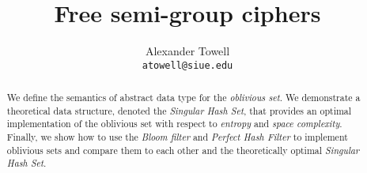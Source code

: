 \documentclass[final,11pt,hidelinks]{article}
\title
{
    Free semi-group ciphers
}
\author
{
    Alexander Towell\\
    \texttt{atowell@siue.edu}
}
\date{}
\begin{document}
\maketitle
\begin{abstract}
We define the semantics of abstract data type for the \emph{oblivious set}. We demonstrate a theoretical data structure, denoted the \emph{Singular Hash Set}, that provides an optimal implementation of the oblivious set with respect to \emph{entropy} and \emph{space complexity}. Finally, we show how to use the \emph{Bloom filter} and \emph{Perfect Hash Filter} to implement oblivious sets and compare them to each other and the theoretically optimal \emph{Singular Hash Set}.
\end{abstract}


\tableofcontents
{}



%





%
\printglossary

\end{document}
